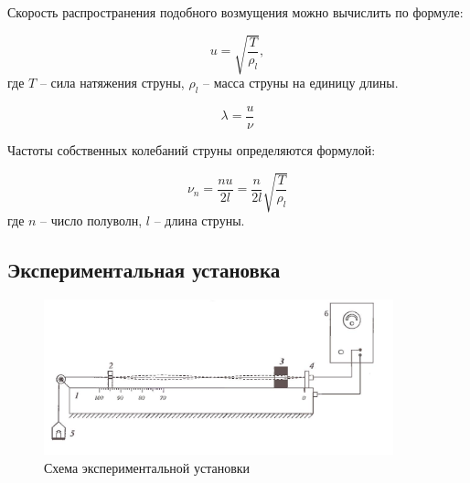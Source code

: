 \documentclass[a4paper, 12pt]{article}
\begin{document}
	Скорость распространения подобного возмущения можно вычислить по формуле:

    \begin{center}

        \begin{equation}
		u = \sqrt{\frac{T}{\rho_l}},
            \label{velocity_of_deformation}
	\end{equation}
    где $T$ -- сила натяжения струны, $\rho_{l}$ -- масса струны на единицу длины.

    \begin{equation}
		\lambda = \frac{u}{\nu}
	\end{equation}
	
	Частоты собственных колебаний струны определяются формулой:
	
	\begin{equation}
		\nu_{n} = \frac{nu}{2l} = \frac{n}{2l}\sqrt{\frac{T}{\rho_l}}
            \label{frequency_velocity_equation}
	\end{equation}
	где $n$ -- число полуволн, $l$ -- длина струны.
    \end{center}

    \newpage
    
    \begin{center}
        \subsection*{Экспериментальная установка}

        \begin{figure}[h!]
		\begin{center}
			\includegraphics[width = 0.9\textwidth]{exp145.jpg}
			\caption{Схема экспериментальной установки}
		\end{center}
	\end{figure}
 
    \end{center}
\end{document}
